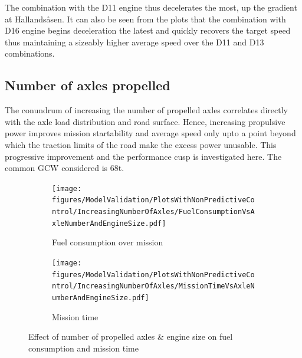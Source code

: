 \documentclass[ExampleMasters.tex]{subfiles}
\begin{document}
The combination with the D11 engine thus decelerates the most, up the gradient at Hallands\aa sen. It can also be seen from the plots that the combination with D16 engine begins deceleration the latest and quickly recovers the target speed thus maintaining a sizeably higher average speed over the D11 and D13 combinations.
\subsection{Number of axles propelled}
The conundrum of increasing the number of propelled axles correlates directly with the axle load distribution and road surface. Hence, increasing propulsive power improves mission startability and average speed only upto a point beyond which the traction limits of the road make the excess power unusable. This progressive improvement and the performance cusp is investigated here. The common GCW considered is 68t.

\begin{figure}
	\begin{subfigure}{.5\textwidth}
		\centering
		\texttt{[image: figures/ModelValidation/PlotsWithNonPredictiveControl/IncreasingNumberOfAxles/FuelConsumptionVsAxleNumberAndEngineSize.pdf]}
		\caption{Fuel consumption over mission}
	\end{subfigure}
	\begin{subfigure}{.5\textwidth}
		\centering
		\texttt{[image: figures/ModelValidation/PlotsWithNonPredictiveControl/IncreasingNumberOfAxles/MissionTimeVsAxleNumberAndEngineSize.pdf]}
		\caption{Mission time}
	\end{subfigure}
	\caption{Effect of number of propelled axles \& engine size on fuel consumption and mission time}
	\label{timeFuelNumberOfAxlesEngine}
\end{figure}
\end{document}
